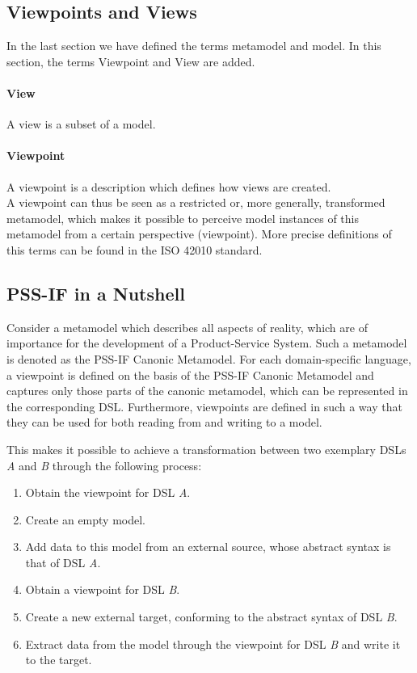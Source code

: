\subsection{Viewpoints and Views}

In the last section we have defined the terms metamodel and model. In this section, the terms Viewpoint and View are added.

\paragraph{View} A view is a subset of a model.

\paragraph{Viewpoint} A viewpoint is a description which defines how views are created.\\

A viewpoint can thus be seen as a restricted or, more generally, transformed metamodel, which makes it possible to perceive model instances of this metamodel from a certain perspective (viewpoint). More precise definitions of this terms can be found in the ISO 42010 standard.

\subsection{PSS-IF in a Nutshell}
\label{sec:approach:pssif:nutshell}

Consider a metamodel which describes all aspects of reality, which are of importance for the development of a Product-Service System. Such a metamodel is denoted as the PSS-IF Canonic Metamodel. For each domain-specific language, a viewpoint is defined on the basis of the PSS-IF Canonic Metamodel and captures only those parts of the canonic metamodel, which can be represented in the corresponding DSL. Furthermore, viewpoints are defined in such a way that they can be used for both reading from and writing to a model.

This makes it possible to achieve a transformation between two exemplary DSLs \textit{A} and \textit{B} through the following process:

\begin{enumerate}
\item Obtain the viewpoint for DSL \textit{A}.
\item Create an empty model.
\item Add data to this model from an external source, whose abstract syntax is that of DSL \textit{A}.
\item Obtain a viewpoint for DSL \textit{B}.
\item Create a new external target, conforming to the abstract syntax of DSL \textit{B}.
\item Extract data from the model through the viewpoint for DSL \textit{B} and write it to the target.
\end{enumerate}

